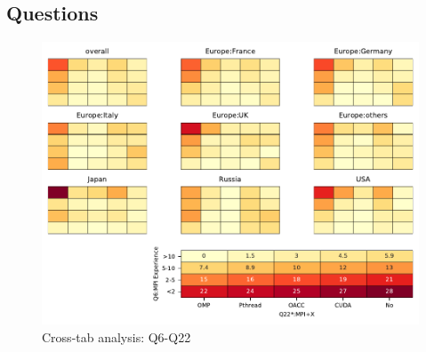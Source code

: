 
\subsection{Questions}


\begin{figure}
\begin{center}
\includegraphics[width=12cm]{../pdfs/Q6-Q22.pdf}
\caption{Cross-tab analysis: Q6-Q22}
\label{fig:Q6-Q22}
\end{center}
\end{figure}
